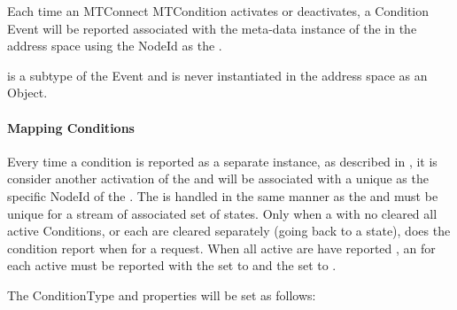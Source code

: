 Each time an MTConnect \gls{MTCondition} activates or deactivates, a \gls{Condition} \gls{Event} will be reported associated with the meta-data instance of the  in the address space using the \gls{NodeId} as the . 

 is a subtype of the \gls{Event} and is never instantiated in the address space as an \gls{Object}.

\paragraph{Mapping Conditions}

Every time a condition is reported as a separate instance, as described in \cite{MTCPart3}, it is consider another activation of the  and will be associated with a unique  as the specific \gls{NodeId} of the . The  is handled in the same manner as the  and must be unique for a stream of associated  set of states. Only when a  with no  cleared all active Conditions, or each are cleared separately (going back to a  state), does the condition report  when for a  request. When all active  are have reported , an  for each active  must be reported with the  set to  and the  set to .

The \gls{ConditionType} and  properties will be set as follows:

